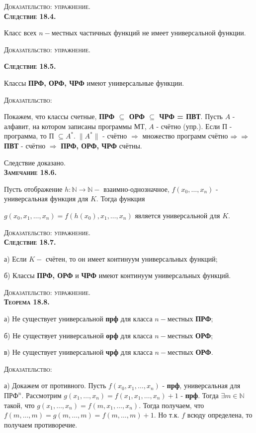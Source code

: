 \documentclass[18pt, a4paper]{extarticle}
\newcommand{\dok}{\textsc{Доказательство:}}
\newcommand{\dokup}{\textsc{Доказательство: упражнение.}}
\begin{document}
\dokup\\

\textbf{\textsc{Следствие 18.4.}} 

Класс всех $n-$местных частичных функций не имеет универсальной функции.

\dokup

\textbf{\textsc{Следствие 18.5.}} 

Классы \textbf{ПРФ, ОРФ, ЧРФ} имеют универсальные функции.

\dok

Покажем, что классы счетные, \textbf{ПРФ $\subseteq$ ОРФ $\subseteq$ ЧРФ = ПВТ}. Пусть $A$ -  алфавит, на котором записаны программы МТ, $A$ - счётно (упр.). Если П - программа, то П $\subseteq A^*.\;\|A^*\|$ - счётно $\Rightarrow$ множество программ счётно $\Rightarrow\newline\Rightarrow$ \textbf{ПВТ} - счётно $\Rightarrow$ \textbf{ПРФ, ОРФ, ЧРФ} счётны.

Следствие доказано.\\

\textbf{\textsc{Замечание 18.6.}} 

Пусть отображение $h:\mathbb N\to \mathbb N-$ взаимно-однозначное, $f(x_0,\dots,x_n)$ -  универсальная функция для $K$. Тогда функция 

$g(x_0,x_1,\dots,x_n)=f(h(x_0),x_1,\dots,x_n)$ является универсальной для $K$.

\dokup\\

\textbf{\textsc{Следствие 18.7.}} 

а) Если $K-$ счётен, то он имеет континуум универсальных функций;

б) Классы \textbf{ПРФ, ОРФ} и \textbf{ЧРФ} имеют континуум универсальных функций.

\dokup\\

\textbf{\textsc{Теорема 18.8.}} 

а) Не существует универсальной \textbf{прф} для класса $n-$местных \textbf{ПРФ};

б) Не существует универсальной \textbf{орф} для класса $n-$местных \textbf{ОРФ};

в) Не существует универсальной \textbf{чрф} для класса $n-$местных \textbf{ОРФ}.

\dok 

а) Докажем от противного. Пусть $f(x_0,x_1,\dots,x_n)$ -  \textbf{прф}, универсальная для \textbf{$\text{ПРФ}^n$}. Рассмотрим $g(x_1,\dots,x_n)=f(x_1,x_1,\dots,x_n)+1$ - \textbf{прф}. Тогда $\exists m\in\mathbb N$ такой, что $g(x_1,\dots,x_n)=f(m,x_1,\dots,x_n)$. Тогда получаем, что $f(m,\dots,m)=g(m,\dots,m)=f(m,\dots,m)+1$. Но т.к. $f$ всюду определена, то получаем противоречие.
\end{document}
